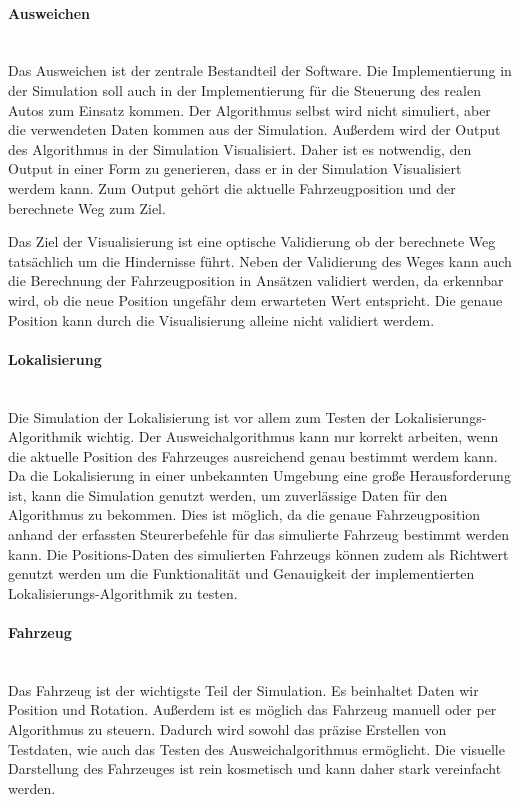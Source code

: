 \paragraph{Ausweichen} \mbox{}\\
Das Ausweichen ist der zentrale Bestandteil der Software.
Die Implementierung in der Simulation soll auch in der Implementierung für die Steuerung des realen Autos zum Einsatz kommen.
Der Algorithmus selbst wird nicht simuliert, aber die verwendeten Daten kommen aus der Simulation. 
Außerdem wird der Output des Algorithmus in der Simulation Visualisiert. 
Daher ist es notwendig, den Output in einer Form zu generieren, dass er in der Simulation Visualisiert werdem kann.
Zum Output gehört die aktuelle Fahrzeugposition und der berechnete Weg zum Ziel.

Das Ziel der Visualisierung ist eine optische Validierung ob der berechnete Weg tatsächlich um die Hindernisse führt. 
Neben der Validierung des Weges kann auch die Berechnung der Fahrzeugposition in Ansätzen validiert werden, da erkennbar wird,
ob die neue Position ungefähr dem erwarteten Wert entspricht. Die genaue Position kann durch die Visualisierung alleine nicht validiert werdem.

\paragraph{Lokalisierung} \mbox{}\\
Die Simulation der Lokalisierung ist vor allem zum Testen der Lokalisierungs-Algorithmik wichtig. 
Der Ausweichalgorithmus kann nur korrekt arbeiten, wenn die aktuelle Position des Fahrzeuges ausreichend genau bestimmt werdem kann.
Da die Lokalisierung in einer unbekannten Umgebung eine große Herausforderung ist, 
kann die Simulation genutzt werden, um zuverlässige Daten für den Algorithmus zu bekommen. 
Dies ist möglich, da die genaue Fahrzeugposition anhand der erfassten Steurerbefehle für das simulierte Fahrzeug bestimmt werden kann.
Die Positions-Daten des simulierten Fahrzeugs können zudem als Richtwert genutzt werden
um die Funktionalität und Genauigkeit der implementierten Lokalisierungs-Algorithmik zu testen.

\paragraph{Fahrzeug} \mbox{}\\
Das Fahrzeug ist der wichtigste Teil der Simulation.
Es beinhaltet Daten wir Position und Rotation.
Außerdem ist es möglich das Fahrzeug manuell oder per Algorithmus zu steuern.
Dadurch wird sowohl das präzise Erstellen von Testdaten, wie auch das Testen des Ausweichalgorithmus ermöglicht.
Die visuelle Darstellung des Fahrzeuges ist rein kosmetisch und kann daher stark vereinfacht werden. 

